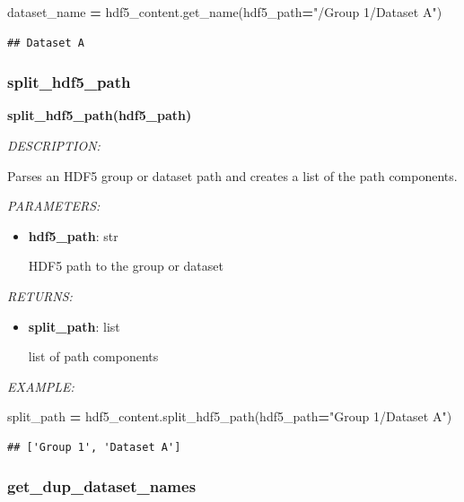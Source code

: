 \documentclass[
]{article}
\newenvironment{Shaded}{\begin{snugshade}}{\end{snugshade}}
\newcommand{\NormalTok}[1]{#1}
\newcommand{\OperatorTok}[1]{\textcolor[rgb]{0.81,0.36,0.00}{\textbf{#1}}}
\newcommand{\StringTok}[1]{\textcolor[rgb]{0.31,0.60,0.02}{#1}}
\begin{document}
\begin{Shaded}
\begin{Highlighting}[]
\NormalTok{dataset_name }\OperatorTok{=}\NormalTok{ hdf5_content.get_name(hdf5_path}\OperatorTok{=}\StringTok{"/Group 1/Dataset A"}\NormalTok{)}
\end{Highlighting}
\end{Shaded}

\begin{verbatim}
## Dataset A
\end{verbatim}

\hypertarget{split_hdf5_path}{%
\subsubsection{split\_hdf5\_path}\label{split_hdf5_path}}

\textbf{split\_hdf5\_path(hdf5\_path)}

\emph{DESCRIPTION:}

Parses an HDF5 group or dataset path and creates a list of the path components.

\emph{PARAMETERS:}

\begin{itemize}
\item
  \textbf{hdf5\_path}: str

  HDF5 path to the group or dataset
\end{itemize}

\emph{RETURNS:}

\begin{itemize}
\item
  \textbf{split\_path}: list

  list of path components
\end{itemize}

\emph{EXAMPLE:}

\begin{Shaded}
\begin{Highlighting}[]
\NormalTok{split_path }\OperatorTok{=}\NormalTok{ hdf5_content.split_hdf5_path(hdf5_path}\OperatorTok{=}\StringTok{"Group 1/Dataset A"}\NormalTok{)}
\end{Highlighting}
\end{Shaded}

\begin{verbatim}
## ['Group 1', 'Dataset A']
\end{verbatim}

\hypertarget{get_dup_dataset_names}{%
\subsubsection{get\_dup\_dataset\_names}\label{get_dup_dataset_names}}
\end{document}
